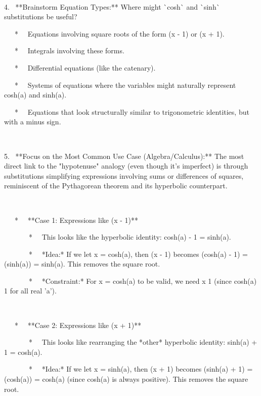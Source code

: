 \documentclass{article}
\newcommand{\nonconverted}[1]{\mbox{}}
\begin{document}
\

4. \ **Brainstorm Equation Types:** Where might \`{}cosh\`{} and \`{}sinh\`{}
substitutions be useful?

\ \ \ * \ \ Equations involving square roots of the form  \nonconverted{sqrt}
(x{\texttwosuperior} - 1) or  \nonconverted{sqrt} (x{\texttwosuperior} + 1).

\ \ \ * \ \ Integrals involving these forms.

\ \ \ * \ \ Differential equations (like the catenary).

\ \ \ * \ \ Systems of equations where the variables might naturally
represent cosh(a) and sinh(a).

\ \ \ * \ \ Equations that look structurally similar to trigonometric
identities, but with a minus sign.

\

5. \ **Focus on the Most Common Use Case (Algebra/Calculus):** The most
direct link to the "hypotenuse" analogy (even though it's imperfect) is
through substitutions simplifying expressions involving sums or differences of
squares, reminiscent of the Pythagorean theorem and its hyperbolic
counterpart.

\

\ \ \ * \ \ **Case 1: Expressions like  \nonconverted{sqrt}
(x{\texttwosuperior} - 1)**

\ \ \ \ \ \ \ * \ \ This looks like the hyperbolic identity:
cosh{\texttwosuperior}(a) - 1 = sinh{\texttwosuperior}(a).

\ \ \ \ \ \ \ * \ \ *Idea:* If we let x = cosh(a), then  \nonconverted{sqrt}
(x{\texttwosuperior} - 1) becomes  \nonconverted{sqrt}
(cosh{\texttwosuperior}(a) - 1) =  \nonconverted{sqrt}
(sinh{\texttwosuperior}(a)) = \textbar sinh(a)\textbar . This removes the
square root.

\ \ \ \ \ \ \ * \ \ *Constraint:* For x = cosh(a) to be valid, we need x
{\geq} 1 (since cosh(a) {\geq} 1 for all real 'a').

\

\ \ \ * \ \ **Case 2: Expressions like  \nonconverted{sqrt}
(x{\texttwosuperior} + 1)**

\ \ \ \ \ \ \ * \ \ This looks like rearranging the *other* hyperbolic
identity: sinh{\texttwosuperior}(a) + 1 = cosh{\texttwosuperior}(a).

\ \ \ \ \ \ \ * \ \ *Idea:* If we let x = sinh(a), then  \nonconverted{sqrt}
(x{\texttwosuperior} + 1) becomes  \nonconverted{sqrt}
(sinh{\texttwosuperior}(a) + 1) =  \nonconverted{sqrt}
(cosh{\texttwosuperior}(a)) = cosh(a) (since cosh(a) is always positive). This
removes the square root.
\end{document}

